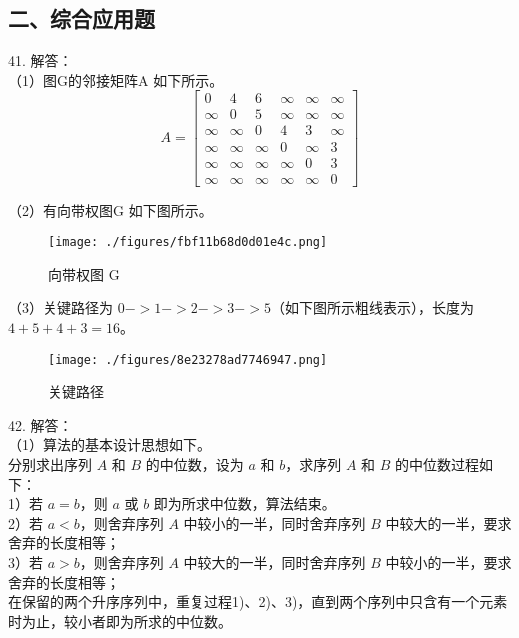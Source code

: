 \subsection{二、综合应用题}

41. 解答： \\
（1）图G的邻接矩阵A 如下所示。 \\
\begin{equation}
A=
\begin{bmatrix}
 0 & 4 & 6 & \infty & \infty & \infty \\
 \infty & 0 & 5 & \infty & \infty & \infty \\
 \infty & \infty & 0 & 4 & 3 & \infty \\
 \infty & \infty & \infty & 0 & \infty & 3 \\
 \infty & \infty & \infty & \infty & 0 & 3 \\
 \infty & \infty & \infty & \infty & \infty & 0 
\end{bmatrix}
\end{equation}


（2）有向带权图G 如下图所示。 \\
\begin{figure}[ht]
\centering
\texttt{[image: ./figures/fbf11b68d0d01e4c.png]}
\caption{向带权图 G} \label{fig_Na11_2}
\end{figure}

（3）关键路径为 $0->1->2->3->5$（如下图所示粗线表示），长度为 $4+5+4+3=16$。 \\
\begin{figure}[ht]
\centering
\texttt{[image: ./figures/8e23278ad7746947.png]}
\caption{关键路径} \label{fig_Na11_3}
\end{figure}

42. 解答： \\
（1）算法的基本设计思想如下。 \\
分别求出序列 $A$ 和 $B$ 的中位数，设为 $a$ 和 $b$，求序列 $A$ 和 $B$ 的中位数过程如下： \\
1）若 $a=b$，则 $a$ 或 $b$ 即为所求中位数，算法结束。 \\
2）若 $a<b$，则舍弃序列 $A$ 中较小的一半，同时舍弃序列 $B$ 中较大的一半，要求舍弃的长度相等； \\
3）若 $a>b$，则舍弃序列 $A$ 中较大的一半，同时舍弃序列 $B$ 中较小的一半，要求舍弃的长度相等； \\
在保留的两个升序序列中，重复过程1)、2)、3)，直到两个序列中只含有一个元素时为止，较小者即为所求的中位数。


